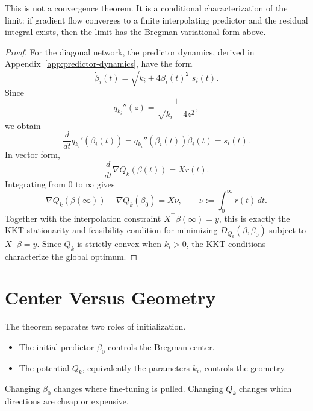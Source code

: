 \documentclass[11pt]{article}
\begin{document}
This is not a convergence theorem. It is a conditional characterization of the limit: if gradient flow converges to a finite interpolating predictor and the residual integral exists, then the limit has the Bregman variational form above.

\begin{proof}
For the diagonal network, the predictor dynamics, derived in Appendix~\ref{app:predictor-dynamics}, have the form
\begin{equation}
    \dot\beta_i(t)
    =
    \sqrt{k_i+4\beta_i(t)^2}\;s_i(t).
\end{equation}
Since
\begin{equation}
    q_{k_i}''(z)=\frac{1}{\sqrt{k_i+4z^2}},
\end{equation}
we obtain
\begin{equation}
    \frac{d}{dt}q_{k_i}'(\beta_i(t))
    =
    q_{k_i}''(\beta_i(t))\dot\beta_i(t)
    =
    s_i(t).
\end{equation}
In vector form,
\begin{equation}
    \frac{d}{dt}\nabla Q_k(\beta(t))=Xr(t).
\end{equation}
Integrating from \(0\) to \(\infty\) gives
\begin{equation}
    \nabla Q_k(\beta(\infty))-\nabla Q_k(\beta_0)=X\nu,
    \qquad
    \nu:=\int_0^\infty r(t)\,dt.
\end{equation}
Together with the interpolation constraint \(X^\top\beta(\infty)=y\), this is exactly the KKT stationarity and feasibility condition for minimizing \(D_{Q_k}(\beta,\beta_0)\) subject to \(X^\top\beta=y\). Since \(Q_k\) is strictly convex when \(k_i>0\), the KKT conditions characterize the global optimum.
\end{proof}

\section{Center Versus Geometry}

The theorem separates two roles of initialization.
\begin{itemize}
    \item The initial predictor \(\beta_0\) controls the Bregman center.
    \item The potential \(Q_k\), equivalently the parameters \(k_i\), controls the geometry.
\end{itemize}
Changing \(\beta_0\) changes where fine-tuning is pulled. Changing \(Q_k\) changes which directions are cheap or expensive.
\end{document}
